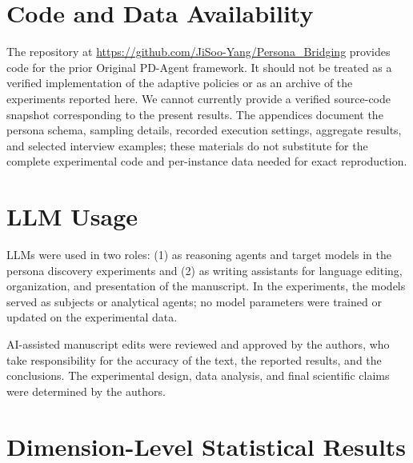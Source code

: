 \documentclass{ieeeaccess}
\begin{document}
\section*{Code and Data Availability}
The repository at \url{https://github.com/JiSoo-Yang/Persona_Bridging} provides
code for the prior Original PD-Agent framework. It should not be treated as a verified
implementation of the adaptive policies or as an archive of the experiments reported here.
We cannot currently provide a verified source-code snapshot corresponding to the present
results. The appendices document the persona schema, sampling details, recorded execution
settings, aggregate results, and selected interview examples; these materials do not
substitute for the complete experimental code and per-instance data needed for exact
reproduction.

\section*{LLM Usage}
LLMs were used in two roles: (1) as reasoning agents and target models in the persona
discovery experiments and (2) as writing assistants for language editing, organization, and
presentation of the manuscript. In the experiments, the models served as subjects or
analytical agents; no model parameters were trained or updated on the experimental data.

AI-assisted manuscript edits were reviewed and approved by the authors, who take
responsibility for the accuracy of the text, the reported results, and the conclusions. The
experimental design, data analysis, and final scientific claims were determined by the
authors.

\onecolumn
\raggedbottom
\appendices
\section{Dimension-Level Statistical Results}
\renewcommand{\thetable}{S1}
\end{document}
